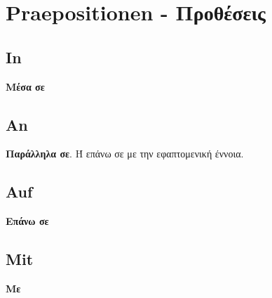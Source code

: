 

\section{Praepositionen - Προθέσεις}



\subsection{In}

\textbf{Μέσα σε}

\subsection{An}

\textbf{Παράλληλα σε}. Ή επάνω σε με την εφαπτομενική έννοια.

\subsection{Auf}

\textbf{Επάνω σε}

\subsection{Mit}

\textbf{Με}
